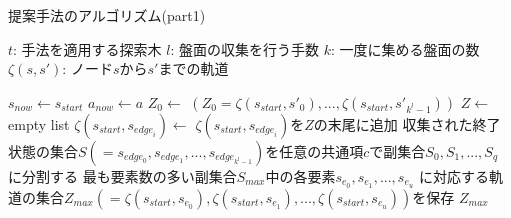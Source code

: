 \begin{algorithm}
    \caption{提案手法のアルゴリズム(part1)}
    \begin{algorithmic}[1]
        \State $t$: 手法を適用する探索木
        \State $l$: 盤面の収集を行う手数
        \State $k$: 一度に集める盤面の数
        \State $\zeta(s, s')$: ノード$s$から$s'$までの軌道
        
       
           \State $s_{now}\gets s_{start}$
           \State $a_{now}\gets a$
           \State $Z_0 \gets$
           \State $(Z_0 ={\zeta(s_{start}, {s'}_0), ..., \zeta(s_{start}, {s'}_{k^l-1})})$
           \State $ Z \gets$ empty list
             \State $\zeta(s_{start}, s_{{edge}_i}) \gets$ 
             \State $\zeta(s_{start}, s_{{edge}_i})$を$Z$の末尾に追加
           \EndFor
           \State 収集された終了状態の集合$S(={s_{edge_0},s_{edge_1}, ..., s_{edge_{k^l-1}}})$を任意の共通項$c$で副集合${S_0, S_1, ..., S_q}$に分割する
           \State 最も要素数の多い副集合$S_{max}$中の各要素${s_{e_0}, s_{e_1}, ...,  s_{e_u}}$
           \State に対応する軌道の集合$Z_{max}(=\zeta(s_{start}, s_{e_0}), \zeta(s_{start}, s_{e_1}), ..., \zeta(s_{start}, s_{e_u}))$を保存
           \State \Return $Z_{max}$
        \EndFunction
    \end{algorithmic}
\end{algorithm}
